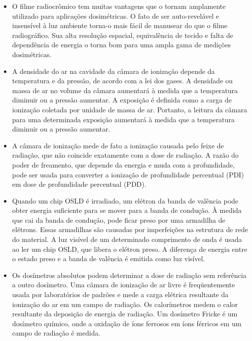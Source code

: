 \documentclass[11pt,a4paper]{article}
\newcounter{exemplo}
\begin{document}
\begin{exemplo}[Dosimetria]
    \begin{itemize}
        \item O filme radiocrômico tem muitas vantagens que o tornam amplamente utilizado para aplicações dosimétricas. O fato de ser auto-revelável e insensível à luz ambiente torna-o mais fácil de manusear do que o filme radiográfico. Sua alta resolução espacial, equivalência de tecido e falta de dependência de energia o torna bom para uma ampla gama de medições dosimétricas.
        
        \item A densidade do ar na cavidade da câmara de ionização depende da temperatura e da pressão, de acordo com a lei dos gases. A densidade ou massa de ar no volume da câmara aumentará à medida que a temperatura diminuir ou a pressão aumentar. A exposição é definida como a carga de ionização coletada por unidade de massa de ar. Portanto, a leitura da câmara para uma determinada exposição aumentará à medida que a temperatura diminuir ou a pressão aumentar.
        
        \item A câmara de ionização mede de fato a ionização causada pelo feixe de radiação, que não coincide exatamente com a dose de radiação. A razão do poder de freamento, que depende da energia e muda com a profundidade, pode ser usada para converter a ionização de profundidade percentual (PDI) em dose de profundidade percentual (PDD).
        
        \item Quando um chip OSLD é irradiado, um elétron da banda de valência pode obter energia suficiente para se mover para a banda de condução. À medida que cai da banda de condução, pode ficar preso por uma armadilha de elétrons. Essas armadilhas são causadas por imperfeições na estrutura de rede do material. A luz visível de um determinado comprimento de onda é usada ao ler um chip OSLD, que libera o elétron preso. A diferença de energia entre o estado preso e a banda de valência é emitida como luz visível.
        
        \item Os dosímetros absolutos podem determinar a dose de radiação sem referência a outro dosímetro. Uma câmara de ionização de ar livre é freqüentemente usada por laboratórios de padrões e mede a carga elétrica resultante da ionização do ar em um campo de radiação. Os calorímetros medem o calor resultante da deposição de energia de radiação. Um dosímetro Fricke é um dosímetro químico, onde a oxidação de íons ferrosos em íons férricos em um campo de radiação é medida.
        

\end{itemize}
\end{exemplo}
\end{document}
